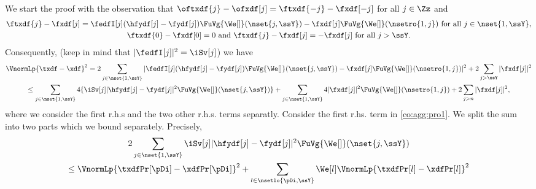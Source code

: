 \begin{pro}
We start the proof with the observation that
$\oftxdf{j}-\ofxdf[j]=\ftxdf{-j}-\fxdf[-j]$ for all $j\in\Zz$ and 
\begin{multline*}
  \ftxdf{j}-\fxdf[j]=\fedfI[j](\hfydf[j]-\fydf[j])\FuVg{\We[]}(\nset{j,\ssY})-\fxdf[j]\FuVg{\We[]}(\nsetro{1,j})\text{ for all }j\in\nset{1,\ssY},\\\ftxdf{0}-\fxdf[0]=0\text{ and }\ftxdf{j}-\fxdf[j]=-\fxdf[j]\text{ for all }j>\ssY.
\end{multline*}
Consequently, (keep in mind that $|\fedfI[j]|^2=\iSv[j]$)  we  have
  \begin{multline}\label{co:agg:pro1}
    \VnormLp{\txdf-\xdf}^2=
   2\sum_{j\in\nset{1,\ssY}}|\fedfI[j](\hfydf[j]-\fydf[j])\FuVg{\We[]}(\nset{j,\ssY})-\fxdf[j]\FuVg{\We[]}(\nsetro{1,j})|^2+2\sum_{j>\ssY}|\fxdf[j]|^2\\
\leq
   \sum_{j\in\nset{1,\ssY}}4\{\iSv[j]|\hfydf[j]-\fydf[j]|^2 \FuVg{\We[]}(\nset{j,\ssY})\} + \sum_{j\in\nset{1,\ssY}}4|\fxdf[j]|^2\FuVg{\We[]}(\nsetro{1,j})+2\sum_{j>n}|\fxdf[j]|^2,%
 \end{multline}
where we consider the first r.h.s and the two other r.h.s. terms
separatly. Consider the first r.hs. term in \eqref{co:agg:pro1}. We split the sum into two parts which we bound separately.  Precisely,
\begin{multline}\label{co:agg:pro2}
2\sum_{j\in\nset{1,\ssY}}\iSv[j]|\hfydf[j]-\fydf[j]|^2
\FuVg{\We[]}(\nset{j,\ssY})\\
\leq \VnormLp{\txdfPr[\pDi]-\xdfPr[\pDi]}^2
+\sum_{l\in\nsetlo{\pDi,\ssY}}\We[l]\VnormLp{\txdfPr[l]-\xdfPr[l]}^2\\

\end{multline}
\end{pro}
